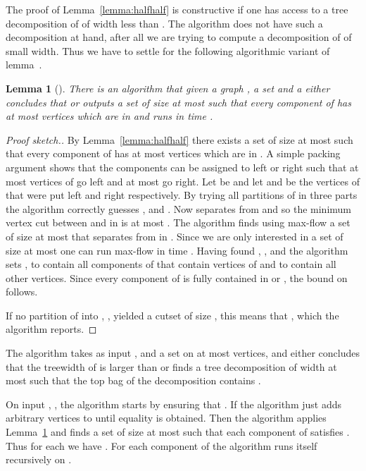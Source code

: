 \documentclass[a4paper,11pt]{article}
\newtheorem{lemma}{Lemma}[section]
\theoremstyle{definition}
\theoremstyle{remark}
\begin{document}
The proof of Lemma~\ref{lemma:halfhalf} is constructive if one has
access to a tree decomposition of  of width less than .  The
algorithm does not have such a decomposition at hand, after all we are
trying to compute a decomposition of  of small width.  Thus we have
to settle for the following algorithmic variant of
lemma~\cite{RobertsonS2}.

\begin{lemma}[\cite{RobertsonS13}]
  \label{lem:halfhalfalg}
  There is an algorithm that given a graph , a set  and a  either concludes that  or outputs a set 
  of size at most  such that every component of 
  has at most  vertices which are in  and runs in
  time .
\end{lemma}

\begin{proof}[Proof sketch.]
  By Lemma~\ref{lemma:halfhalf} there exists a set  of size at
  most  such that every component of  has at most
   vertices which are in .  A simple packing
  argument shows that the components can be assigned to left or right
  such that at most  vertices of  go left and at
  most  go right.  Let  be  and let
   and  be the vertices of  that were put left and right
  respectively.  By trying all partitions of  in three parts the
  algorithm correctly guesses ,  and .  Now 
  separates  from  and so the minimum vertex cut between
   and  in  is at most .  The algorithm finds using max-flow a set  of
  size at most  that separates  from  in .  Since we are only interested in a set  of size
  at most  one can run max-flow in time .
  Having found , ,  and  the algorithm sets ,  to contain all components of  that
  contain vertices of  and  to contain all other vertices.
  Since every component  of  is fully contained in
   or , the bound on  follows.
  
  If no partition of  into , ,  yielded a cutset 
  of size , this means that , which the
  algorithm reports.
\end{proof}

The algorithm takes as input ,  and a set  on at most 
vertices, and either concludes that the treewidth of  is larger
than  or finds a tree decomposition of width at most  such
that the top bag of the decomposition contains .

On input , ,  the algorithm starts by ensuring that
.  If  the algorithm just adds arbitrary
vertices to  until equality is obtained.  Then the algorithm
applies Lemma~\ref{lem:halfhalfalg} and finds a set  of size at
most  such that each component  of  satisfies
.  Thus for each  we
have .  For each component  of
 the algorithm runs itself recursively on .
\end{document}
